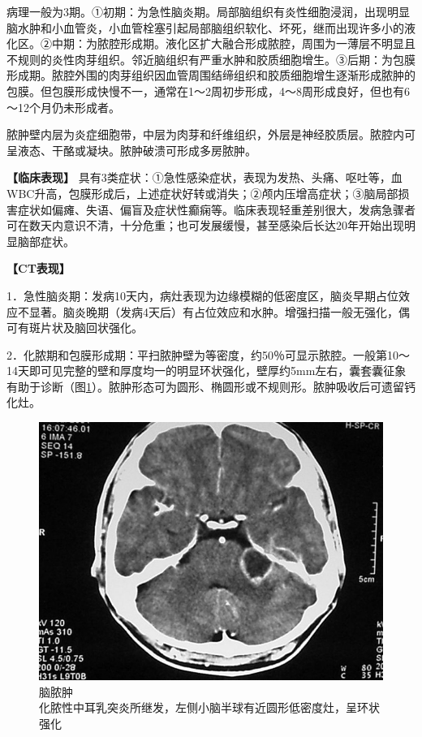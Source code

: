 病理一般为3期。①初期：为急性脑炎期。局部脑组织有炎性细胞浸润，出现明显脑水肿和小血管炎，小血管栓塞引起局部脑组织软化、坏死，继而出现许多小的液化区。②中期：为脓腔形成期。液化区扩大融合形成脓腔，周围为一薄层不明显且不规则的炎性肉芽组织。邻近脑组织有严重水肿和胶质细胞增生。③后期：为包膜形成期。脓腔外围的肉芽组织因血管周围结缔组织和胶质细胞增生逐渐形成脓肿的包膜。但包膜形成快慢不一，通常在1～2周初步形成，4～8周形成良好，但也有6～12个月仍未形成者。

脓肿壁内层为炎症细胞带，中层为肉芽和纤维组织，外层是神经胶质层。脓腔内可呈液态、干酪或凝块。脓肿破溃可形成多房脓肿。

\textbf{【临床表现】}
具有3类症状：①急性感染症状，表现为发热、头痛、呕吐等，血WBC升高，包膜形成后，上述症状好转或消失；②颅内压增高症状；③脑局部损害症状如偏瘫、失语、偏盲及症状性癫痫等。临床表现轻重差别很大，发病急骤者可在数天内意识不清，十分危重；也可发展缓慢，甚至感染后长达20年开始出现明显脑部症状。

\textbf{【CT表现】}

1．急性脑炎期：发病10天内，病灶表现为边缘模糊的低密度区，脑炎早期占位效应不显著。脑炎晚期（发病4天后）有占位效应和水肿。增强扫描一般无强化，偶可有斑片状及脑回状强化。

2．化脓期和包膜形成期：平扫脓肿壁为等密度，约50％可显示脓腔。一般第10～14天即可见完整的壁和厚度均一的明显环状强化，壁厚约5mm左右，囊套囊征象有助于诊断（图\ref{fig2-53}）。脓肿形态可为圆形、椭圆形或不规则形。脓肿吸收后可遗留钙化灶。

\begin{figure}[!htbp]
 \centering
 \includegraphics[width=.7\textwidth,height=\textheight,keepaspectratio]{./images/Image00091.jpg}
 \captionsetup{justification=centering}
 \caption{脑脓肿\\{\small 化脓性中耳乳突炎所继发，左侧小脑半球有近圆形低密度灶，呈环状强化}}
 \label{fig2-53}
  \end{figure} 

